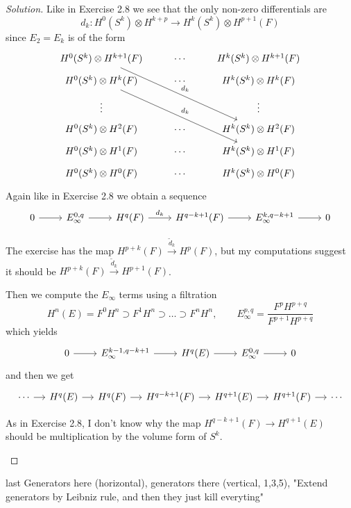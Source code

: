 \begin{proof}[Solution]\leavevmode
\iffalse The argument to construct the Wang exact sequence
\[\begin{tikzcd}[column sep=small]
	\cdots\arrow[r]&H_{q}(F)\arrow[r]&H_{q}(E)\arrow[r]&H_{q-n}(F)\arrow[r]&H_{q-1}(F)\arrow[r]&H_{q-1}(E)\arrow[r]&H_{q-n-1}(F)\arrow[r]&\cdots
\end{tikzcd}\]
is analogous to exercise 2.8.\fi
Like in Exercise 2.8 we see that the only non-zero differentials are
\[d_k:H^{0}(S^k)\otimes H^{k+p}\longrightarrow H^{k}(S^k)\otimes H^{p+1}(F)\]
since $E_{2}=E_k$ is of the form
\[\begin{tikzcd}[row sep=tiny]
H^{0}(S^k)\otimes H^{k+1}(F)\arrow[rrddd,"d_k"]&\cdots & H^k(S^k)\otimes H^{k+1}(F)\\
	H^{0}(S^k)\otimes H^{k}(F)  \arrow[rrddd,"d_{k}"]&\cdots &H^{k}(S^k)\otimes H^{k}(F)\\
	\vdots &&\vdots \\
	H^{0}(S^k)\otimes H^{2}(F)&\cdots &H^{k}(S^k)\otimes H^{2}(F)\\
	H^{0}(S^k)\otimes H^{1}(F)&\cdots&H^k(S^k)\otimes H^{1}(F)\\
	H^{0}(S^k)\otimes H^{0}(F)&\cdots&H^{k}(S^k)\otimes H^{0}(F) 
\end{tikzcd}\]
Again like in Exercise 2.8 we obtain a sequence
\[\begin{tikzcd}
	0\arrow[r]&E_{\infty}^{0,q}\arrow[r]& H^{q}(F)\arrow[r,"d_k"]&H^{q-k+1}(F)\arrow[r]& E^{k,q-k+1}_{\infty}\arrow[r]&0
\end{tikzcd}\]
\begin{remark}
	The exercise has the map $H^{p+k}(F)\overset{\tilde{d}_{k}}{\longrightarrow} H^{p}(F)$, but my computations suggest it should be $H^{p+k}(F)\overset{\tilde{d}_k}{\longrightarrow}H^{p+1}(F)$.
\end{remark}
Then we compute the $E_{\infty}$ terms using a filtration
\[H^{n}(E)=F^0H^n\supset F^1H^n\supset  \ldots \supset F^nH^n,\qquad E_\infty^{p,q}=\frac{F^pH^{p+q}}{F^{p+1}H^{p+q}}\]
which yields
\[\begin{tikzcd}
	0\arrow[r]&E^{k-1,q-k+1}_{\infty}\arrow[r]&H^{q}(E)\arrow[r]&E^{0,q}_{\infty}\arrow[r]&0
\end{tikzcd}\]
and then we get
\[\begin{tikzcd}[column sep=small]
	\cdots\arrow[r]&H^{q}(E)\arrow[r]&H^{q}(F)\arrow[r]&H^{q-k+1}(F)\arrow[r]&H^{q+1}(E)\arrow[r]&H^{q+1}(F)\arrow[r]&\cdots
\end{tikzcd}\]
\begin{remark}
	As in Exercise 2.8, I don't know why the map $H^{q-k+1}(F)\to H^{q+1}(E)$ should be multiplication by the volume form of $S^k$.
\end{remark}


\end{proof}

\begin{manualexercise}{last}
	Generators here (horizontal), generators there (vertical, 1,3,5), "Extend generators by Leibniz rule, and then they just kill everyting"
\end{manualexercise}


